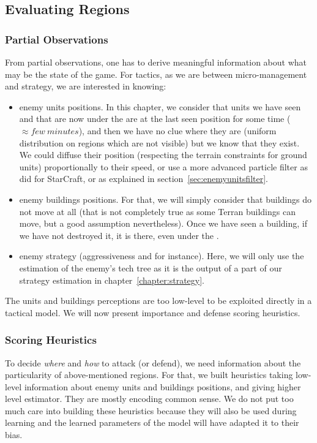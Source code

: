 \subsection{Evaluating Regions}
\subsubsection{Partial Observations}
From partial observations, one has to derive meaningful information about what may be the state of the game. For tactics, as we are between micro-management and strategy, we are interested in knowing:
\begin{itemize}
    \item enemy units positions. In this chapter, we consider that units we have seen and that are now under the  are at the last seen position for some time ($\approx few\ minutes$), and then we have no clue where they are (uniform distribution on regions which are not visible) but we know that they exist. We could diffuse their position (respecting the terrain constraints for ground units) proportionally to their speed, or use a more advanced particle filter as \cite{weber2011aiide} did for StarCraft, or as explained in section~\ref{sec:enemyunitsfilter}.
    \item enemy buildings positions. For that, we will simply consider that buildings do not move at all (that is not completely true as some Terran buildings can move, but a good assumption nevertheless). Once we have seen a building, if we have not destroyed it, it is there, even under the . 
    \item enemy strategy (aggressiveness and  for instance). Here, we will only use the estimation of the enemy's tech tree as it is the output of a part of our strategy estimation in chapter~\ref{chapter:strategy}.
\end{itemize}
The units and buildings perceptions are too low-level to be exploited directly in a tactical model. We will now present importance and defense scoring heuristics.

\subsubsection{Scoring Heuristics}
\label{sec:scoringheuristics}
To decide \textit{where} and \textit{how} to attack (or defend), we need information about the particularity of above-mentioned regions. For that, we built heuristics taking low-level information about enemy units and buildings positions, and giving higher level estimator. They are mostly encoding common sense. We do not put too much care into building these heuristics because they will also be used during learning and the learned parameters of the model will have adapted it to their bias. 

